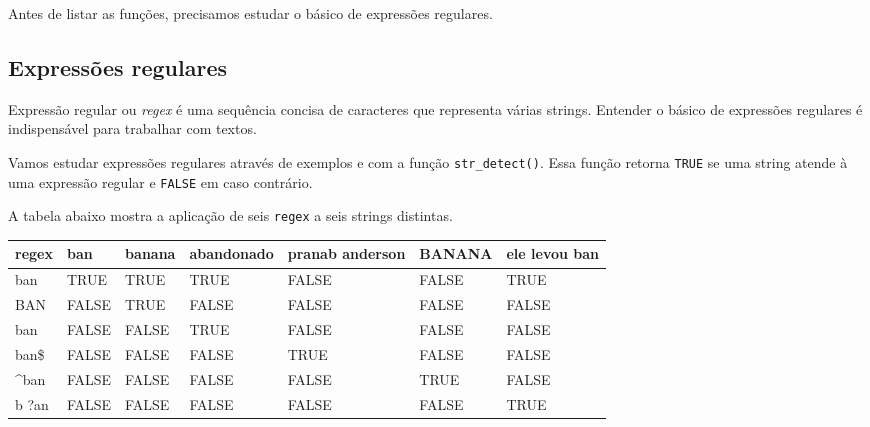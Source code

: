 \documentclass[]{book}
\newenvironment{Shaded}{\begin{snugshade}}{\end{snugshade}}
\newcommand{\KeywordTok}[1]{\textcolor[rgb]{0.13,0.29,0.53}{\textbf{{#1}}}}
\newcommand{\DataTypeTok}[1]{\textcolor[rgb]{0.13,0.29,0.53}{{#1}}}
\newcommand{\StringTok}[1]{\textcolor[rgb]{0.31,0.60,0.02}{{#1}}}
\newcommand{\CommentTok}[1]{\textcolor[rgb]{0.56,0.35,0.01}{\textit{{#1}}}}
\newcommand{\OtherTok}[1]{\textcolor[rgb]{0.56,0.35,0.01}{{#1}}}
\newcommand{\NormalTok}[1]{{#1}}
\begin{document}
Antes de listar as funções, precisamos estudar o básico de expressões
regulares.

\subsection{Expressões regulares}\label{expressoes-regulares}

Expressão regular ou \emph{regex} é uma sequência concisa de caracteres
que representa várias strings. Entender o básico de expressões regulares
é indispensável para trabalhar com textos.

Vamos estudar expressões regulares através de exemplos e com a função
\texttt{str\_detect()}. Essa função retorna \texttt{TRUE} se uma string
atende à uma expressão regular e \texttt{FALSE} em caso contrário.

A tabela abaixo mostra a aplicação de seis \texttt{regex} a seis strings
distintas.

\begin{Shaded}
\end{Shaded}

\begin{tabular}{l|l|l|l|l|l|l}
\hline
regex & ban & banana & abandonado & pranab anderson & BANANA & ele levou ban\\
\hline
ban & TRUE & TRUE & TRUE & FALSE & FALSE & TRUE\\
\hline
BAN & FALSE & TRUE & FALSE & FALSE & FALSE & FALSE\\
\hline
ban & FALSE & FALSE & TRUE & FALSE & FALSE & FALSE\\
\hline
ban\$ & FALSE & FALSE & FALSE & TRUE & FALSE & FALSE\\
\hline
\textasciicircum{}ban & FALSE & FALSE & FALSE & FALSE & TRUE & FALSE\\
\hline
b ?an & FALSE & FALSE & FALSE & FALSE & FALSE & TRUE\\
\hline
\end{tabular}
\end{document}
